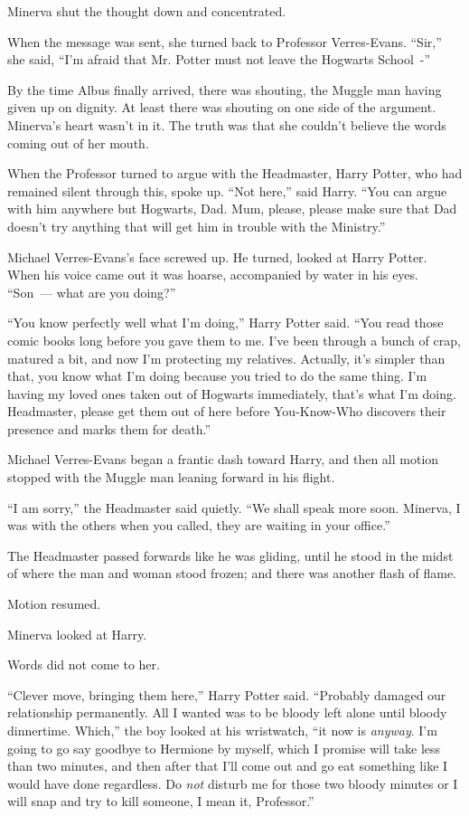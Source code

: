 Minerva shut the thought down and concentrated.

When the message was sent, she turned back to Professor Verres-Evans. ``Sir,'' she said, ``I'm afraid that Mr. Potter must not leave the Hogwarts School~-''

By the time Albus finally arrived, there was shouting, the Muggle man having given up on dignity. At least there was shouting on one side of the argument. Minerva's heart wasn't in it. The truth was that she couldn't believe the words coming out of her mouth.

When the Professor turned to argue with the Headmaster, Harry Potter, who had remained silent through this, spoke up. ``Not here,'' said Harry. ``You can argue with him anywhere but Hogwarts, Dad. Mum, please, please make sure that Dad doesn't try anything that will get him in trouble with the Ministry.''

Michael Verres-Evans's face screwed up. He turned, looked at Harry Potter. When his voice came out it was hoarse, accompanied by water in his eyes. ``Son~--- what are you doing?''

``You know perfectly well what I'm doing,'' Harry Potter said. ``You read those comic books long before you gave them to me. I've been through a bunch of crap, matured a bit, and now I'm protecting my relatives. Actually, it's simpler than that, you know what I'm doing because you tried to do the same thing. I'm having my loved ones taken out of Hogwarts immediately, that's what I'm doing. Headmaster, please get them out of here before You-Know-Who discovers their presence and marks them for death.''

Michael Verres-Evans began a frantic dash toward Harry, and then all motion stopped with the Muggle man leaning forward in his flight.

``I am sorry,'' the Headmaster said quietly. ``We shall speak more soon. Minerva, I was with the others when you called, they are waiting in your office.''

The Headmaster passed forwards like he was gliding, until he stood in the midst of where the man and woman stood frozen; and there was another flash of flame.

Motion resumed.

Minerva looked at Harry.

Words did not come to her.

``Clever move, bringing them here,'' Harry Potter said. ``Probably damaged our relationship permanently. All I wanted was to be bloody left alone until bloody dinnertime. Which,'' the boy looked at his wristwatch, ``it now is \emph{anyway}. I'm going to go say goodbye to Hermione by myself, which I promise will take less than two minutes, and then after that I'll come out and go eat something like I would have done regardless. Do \emph{not} disturb me for those two bloody minutes or I will snap and try to kill someone, I mean it, Professor.''

